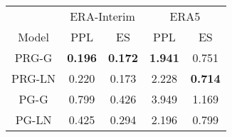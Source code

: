 
\begin{tabular}{ccccc}
\toprule
\multicolumn{1}{c}{ } & \multicolumn{2}{c}{ERA-Interim} & \multicolumn{2}{c}{ERA5} \\
\cmidrule(l{3pt}r{3pt}){2-3} \cmidrule(l{3pt}r{3pt}){4-5}
Model & PPL & ES & PPL & ES\\
\midrule
PRG-G  & {\bf 0.196} & {\bf 0.172} & {\bf 1.941} & 0.751       \\
PRG-LN & 0.220       & 0.173       & 2.228       & {\bf 0.714} \\
PG-G   & 0.799       & 0.426       & 3.949       & 1.169       \\
PG-LN  & 0.425       & 0.294       & 2.196       & 0.799       \\
\bottomrule
\end{tabular}
